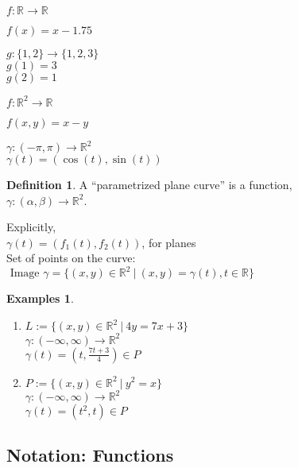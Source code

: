 \documentclass[twocolumn,20pt,fleqn]{extarticle}
\newcommand{\sep}{\vspace{0.5cm}}
\theoremstyle{plain}
\theoremstyle{definition}
\newtheorem*{definition}{Definition}
\newtheorem*{exmpls}{Examples}
\theoremstyle{remark}
\newenvironment*{examples}{\begin{exmpls} ~ \begin{enumerate}}{\end{enumerate}\end{exmpls}}
\begin{document}
$ f: \mathbb{R}  \to \mathbb{R}$

$f(x) = x - 1.75$\\

\sep

  $g : \{1,2\} \to \{1,2,3\}$\\
    $g(1) = 3$\\
    $g(2) = 1$\\

\sep

$ f: \mathbb{R}^2  \to \mathbb{R}$

$f(  x,y  ) = x - y$


\sep

$\gamma :  (-\pi,\pi)  \to \mathbb{R}^2$\\
$\gamma(t) = (\cos(t), \sin(t))$



\newpage



\begin{definition}
  A  ``parametrized plane curve''  is a  function,\\ $\gamma  : (\alpha, \beta) \to \mathbb{R}^2$.
\end{definition}

Explicitly,\\
$\gamma(t) = (f_1(t), f_2(t))$, for planes\\

Set of points on the curve:\\  $\textrm{ Image } \gamma = \{(x,y) \in \mathbb{R}^2 \ |\ (x,y) = \gamma(t), t \in \mathbb{R}\}$




\begin{examples}
  \item $L:=\{(x,y) \in \mathbb{R}^2\ |\ 4y = 7x + 3\}$\\
  $\gamma  : (-\infty,\infty) \to \mathbb{R}^2$ \\
  $\gamma(t) = (t, \frac{7t+3}{4})  \in P$\\
  \item $P:=\{(x,y) \in \mathbb{R}^2\ |\ y^2 = x\}$\\
  $\gamma  : (-\infty,\infty) \to \mathbb{R}^2$ \\
  $\gamma(t) = (t^2, t)  \in P$\\\end{examples}


\clearpage




\subsection{Notation: Functions}
\end{document}
